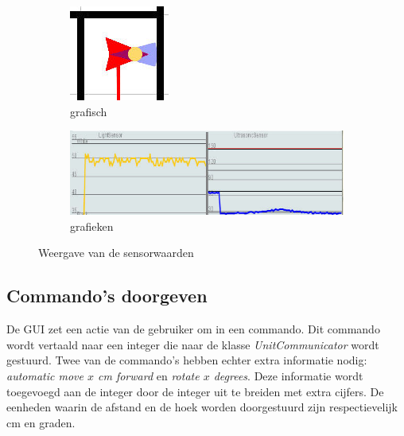 \documentclass[eind]{penoverslag}
\begin{document}
\begin{figure}
        \centering
        \begin{subfigure}[hb]{0.25\textwidth}
                \centering
                \includegraphics[width=\textwidth]{guiRobot}
                \caption{grafisch}
        \end{subfigure}%
        \begin{subfigure}[hb]{0.75\textwidth}
                \centering
                \includegraphics[width=\textwidth]{guiSensor}
                \caption{grafieken}
        \end{subfigure}
 \caption{Weergave van de sensorwaarden}
\label{fig:guiSensoren}
\end{figure}

\subsection{Commando's doorgeven} %
\label{ssec:commands}
De GUI zet een actie van de gebruiker om in een commando. Dit commando wordt vertaald naar een integer die naar de klasse \textit{UnitCommunicator} wordt gestuurd. Twee van de commando's hebben echter extra informatie nodig: \textit{automatic move $x$ cm forward} en \textit{rotate $x$ degrees}. Deze informatie wordt toegevoegd aan de integer door de integer uit te breiden met extra cijfers. De eenheden waarin de afstand en de hoek worden doorgestuurd zijn respectievelijk cm en graden.\\
\end{document}

